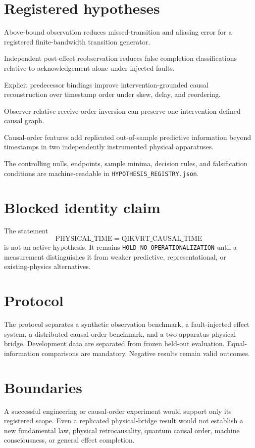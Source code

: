 \documentclass[11pt]{article}
\begin{document}
\section{Registered hypotheses}
\begin{description}[leftmargin=2.2cm,style=nextline]
\item[H-OBS-01] Above-bound observation reduces missed-transition and aliasing error for a registered finite-bandwidth transition generator.
\item[H-EFF-02] Independent post-effect reobservation reduces false completion classifications relative to acknowledgement alone under injected faults.
\item[H-CAU-03] Explicit predecessor bindings improve intervention-grounded causal reconstruction over timestamp order under skew, delay, and reordering.
\item[H-ORD-04] Observer-relative receive-order inversion can preserve one intervention-defined causal graph.
\item[H-PHY-05] Causal-order features add replicated out-of-sample predictive information beyond timestamps in two independently instrumented physical apparatuses.
\end{description}

The controlling nulls, endpoints, sample minima, decision rules, and falsification conditions are machine-readable in \texttt{HYPOTHESIS\_REGISTRY.json}.

\section{Blocked identity claim}
The statement
\[
\mathrm{PHYSICAL\_TIME} = \mathrm{QIKVRT\_CAUSAL\_TIME}
\]
is not an active hypothesis. It remains \texttt{HOLD\_NO\_OPERATIONALIZATION} until a measurement distinguishes it from weaker predictive, representational, or existing-physics alternatives.

\section{Protocol}
The protocol separates a synthetic observation benchmark, a fault-injected effect system, a distributed causal-order benchmark, and a two-apparatus physical bridge. Development data are separated from frozen held-out evaluation. Equal-information comparisons are mandatory. Negative results remain valid outcomes.

\section{Boundaries}
A successful engineering or causal-order experiment would support only its registered scope. Even a replicated physical-bridge result would not establish a new fundamental law, physical retrocausality, quantum causal order, machine consciousness, or general effect completion.
\end{document}
